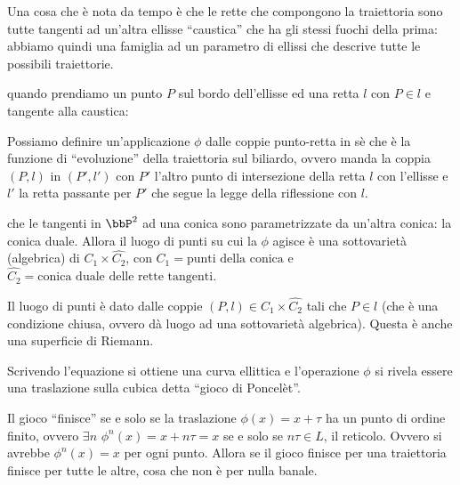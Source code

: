 Una cosa che è nota da tempo è che le rette che compongono la
traiettoria sono tutte tangenti ad un'altra ellisse ``caustica'' che ha
gli stessi fuochi della prima: abbiamo quindi una famiglia ad un
parametro di ellissi che descrive tutte le possibili traiettorie.

 quando prendiamo un punto $P$
sul bordo dell'ellisse ed una retta $l$ con $P \in l$ e tangente alla
caustica:

Possiamo definire un'applicazione $\phi$ dalle coppie punto-retta in sè
che è la funzione di ``evoluzione'' della traiettoria sul biliardo,
ovvero manda la coppia $(P, l)$ in $(P', l')$ con $P'$ l'altro punto di
intersezione della retta $l$ con l'ellisse e $l'$ la retta passante per
$P'$ che segue la legge della riflessione con $l$.


 che le tangenti in $\bbP^2$ ad una conica sono
parametrizzate da un'altra conica: la conica duale.
Allora il luogo di punti su cui la $\phi$ agisce è una sottovarietà
(algebrica) di $C_1 \times \hat{C_2}$, con $C_1 = \text{punti della
  conica}$ e $\hat{C_2} = \text{conica duale delle rette tangenti}$.

Il luogo di punti è dato dalle coppie $(P, l) \in C_1 \times \hat{C_2}$
tali che $P \in l$ (che è una condizione chiusa, ovvero dà luogo ad una
sottovarietà algebrica). Questa è anche una superficie di Riemann.

Scrivendo l'equazione si ottiene una curva ellittica e l'operazione
$\phi$ si rivela essere una traslazione sulla cubica detta ``gioco di
Poncelèt''.

Il gioco ``finisce'' se e solo se la traslazione $\phi(x) = x + \tau$ ha
un punto di ordine finito, ovvero $\exists n$
$\phi^n (x) = x + n\tau = x$ se e solo se $n\tau \in L$, il
reticolo. Ovvero si avrebbe $\phi^n(x) = x$ per ogni punto. Allora se il
gioco finisce per una traiettoria finisce per tutte le altre, cosa che
non è per nulla banale.


